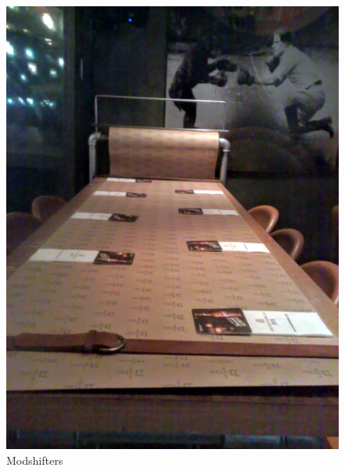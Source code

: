 \begin{figure}[!tbp]
\begin{minipage}[b]{0.48\textwidth}
    \includegraphics[width=\textwidth]{project_graphics/collected_modshifters.jpg}
    \caption{Modshifters}
    \label{fig:Modshifters}
  \end{minipage}
\end{figure}